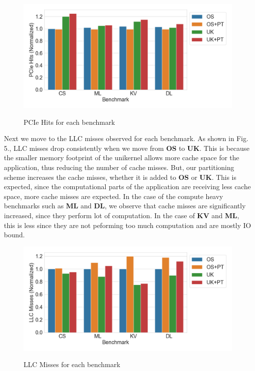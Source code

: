 \documentclass[sigconf,authorversion,noacm]{acmart}
\begin{document}
\begin{figure}[h]
  \centering
  \includegraphics[width=\linewidth]{res1}
    \label{fig:motivating}
    \vspace{-2em}
    \caption{PCIe Hits for each benchmark}
\end{figure}

Next we move to the LLC misses observed for each benchmark. As shown in Fig. 5.,
LLC misses drop consistently when we move from \textbf{OS} to \textbf{UK}. This
is because the smaller memory footprint of the unikernel allows more cache space
for the application, thus reducing the number of cache misses. But, our
partitioning scheme increases the cache misses, whether it is added to
\textbf{OS} or \textbf{UK}. This is expected, since the computational parts of
the application are receiving less cache space, more cache misses are expected.
In the case of the compute heavy benchmarks such as \textbf{ML} and \textbf{DL},
we observe that cache misses are significantly increased, since they perform lot
of computation. In the case of \textbf{KV} and \textbf{ML}, this is less since
they are not peforming too much computation and are mostly IO bound.

\begin{figure}[h]
  \centering
  \includegraphics[width=\linewidth]{res2}
    \label{fig:motivating}
    \vspace{-2em}
    \caption{LLC Misses for each benchmark}
\end{figure}
\end{document}

